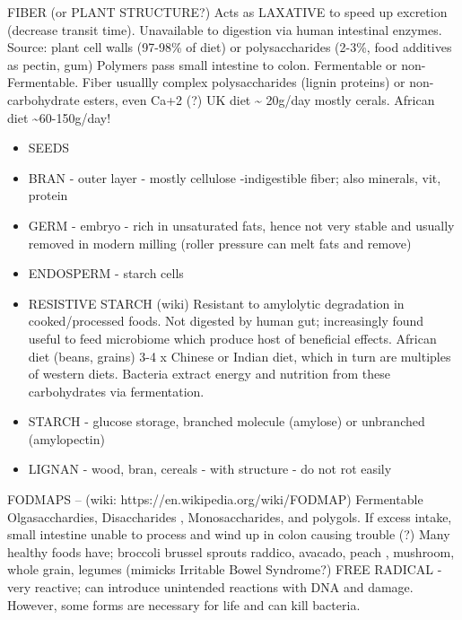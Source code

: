 FIBER (or PLANT STRUCTURE?) Acts as LAXATIVE to speed up excretion
(decrease transit time). Unavailable to digestion via human intestinal
enzymes. Source: plant cell walls (97-98\% of diet) or polysaccharides
(2-3\%, food additives as pectin, gum) Polymers pass small intestine to
colon. Fermentable or non-Fermentable. Fiber usuallly complex
polysaccharides (lignin proteins) or non-carbohydrate esters, even Ca+2
(?) UK diet \textasciitilde{} 20g/day mostly cerals. African diet
\textasciitilde60-150g/day!

\begin{itemize}
\tightlist
\item
  SEEDS
\item
  BRAN - outer layer - mostly cellulose -indigestible fiber; also
  minerals, vit, protein
\item
  GERM - embryo - rich in unsaturated fats, hence not very stable and
  usually removed in modern milling (roller pressure can melt fats and
  remove)
\item
  ENDOSPERM - starch cells
\item
  RESISTIVE STARCH (wiki) Resistant to amylolytic degradation in
  cooked/processed foods. Not digested by human gut; increasingly found
  useful to feed microbiome which produce host of beneficial effects.
  African diet (beans, grains) 3-4 x Chinese or Indian diet, which in
  turn are multiples of western diets. Bacteria extract energy and
  nutrition from these carbohydrates via fermentation.
\item
  STARCH - glucose storage, branched molecule (amylose) or unbranched
  (amylopectin)
\item
  LIGNAN - wood, bran, cereals - with structure - do not rot easily
\end{itemize}

FODMAPS -- (wiki: https://en.wikipedia.org/wiki/FODMAP) Fermentable
Olgasacchardies, Disaccharides , Monosaccharides, and polygols. If
excess intake, small intestine unable to process and wind up in colon
causing trouble (?) Many healthy foods have; broccoli brussel sprouts
raddico, avacado, peach , mushroom, whole grain, legumes (mimicks
Irritable Bowel Syndrome?) FREE RADICAL - very reactive; can introduce
unintended reactions with DNA and damage. However, some forms are
necessary for life and can kill bacteria.

